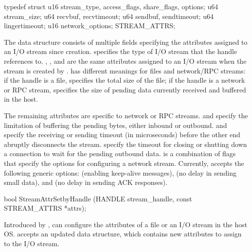 \begin{paldef}
typedef struct {
    u16 stream_type, access_flags, share_flags, options;
    u64 stream_size;
    u64 recvbuf, recvtimeout;
    u64 sendbuf, sendtimeout;
    u64 lingertimeout;
    u16 network_options;
} STREAM_ATTRS;
\end{paldef}


The  data structure consists of multiple fields specifying the attributes assigned to an I/O stream since creation.
 specifies the type of I/O stream that the handle references to.
, , and  are the same attributes assigned to an I/O stream when the stream is created by .
 has different meanings for files and network/RPC streams:
if the handle is a file,  specifies the total size of the file;
if the handle is a network or RPC stream,  specifies the size of pending data currently received and buffered in the host.


The remaining attributes are specific to network or RPC streams.
 and  specify the limitation of buffering the pending bytes, either inbound or outbound.
 and  specify the receiving or sending timeout (in microseconds)
before the other end abruptly disconnects the stream.
 specify the timeout for closing or shutting down a connection
to wait for the pending outbound data.
 is a combination of flags that specify the options for configuring a network stream.
Currently,  accepts the following generic options:
 (enabling keep-alive messages), %
 (no delay in sending small data),
and  (no delay in sending ACK responses).


\begin{paldef}
bool StreamAttrSetbyHandle (HANDLE stream_handle,
                            const STREAM_ATTRS *attrs);
\end{paldef}


Introduced by \graphene{},
 can configure
the attributes of a file or an I/O stream
in the host OS.
 accepts an updated  data structure,
which contains new attributes to assign
to the I/O stream.


